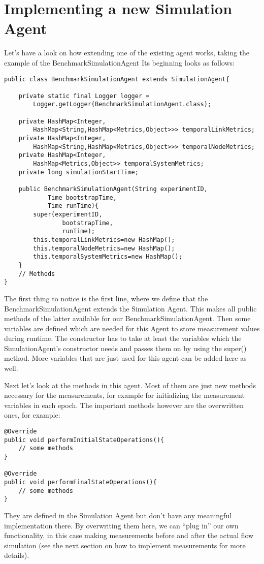 \documentclass[11pt,fleqn]{book} %
\newcommand{\MainAgent}{Simulation Agent}
\newcommand{\BenchmarkAgent}{BenchmarkSimulationAgent}
\begin{document}
\section{Implementing a new \MainAgent}
Let’s have a look on how extending one of the existing agent works, taking the example of the \BenchmarkAgent{} Its beginning looks as follows:
\begin{lstlisting}[frame=single]
public class BenchmarkSimulationAgent extends SimulationAgent{
    
    private static final Logger logger = 
    	Logger.getLogger(BenchmarkSimulationAgent.class);
    
    private HashMap<Integer,
    	HashMap<String,HashMap<Metrics,Object>>> temporalLinkMetrics;
    private HashMap<Integer,
    	HashMap<String,HashMap<Metrics,Object>>> temporalNodeMetrics;
    private HashMap<Integer,
    	HashMap<Metrics,Object>> temporalSystemMetrics;
    private long simulationStartTime;
    
    public BenchmarkSimulationAgent(String experimentID, 
            Time bootstrapTime, 
            Time runTime){
        super(experimentID,
                bootstrapTime,
                runTime);
        this.temporalLinkMetrics=new HashMap();
        this.temporalNodeMetrics=new HashMap();
        this.temporalSystemMetrics=new HashMap();
    }
    // Methods
}
\end{lstlisting}
The first thing to notice is the first line, where we define that the \BenchmarkAgent{} extends the \MainAgent{}. This makes all public methods of the latter available for our \BenchmarkAgent{}. Then some variables are defined which are needed for this Agent to store measurement values during runtime. The constructor has to take at least the variables which the SimulationAgent’s constructor needs and passes them on by using the super() method. More variables that are just used for this agent can be added here as well.

Next let’s look at the methods in this agent. Most of them are just new methods necessary for the measurements, for example for initializing the measurement variables in each epoch. The important methods however are the overwritten ones, for example:
\begin{lstlisting}[frame=single]
@Override
public void performInitialStateOperations(){
	// some methods
}
    
@Override
public void performFinalStateOperations(){
	// some methods
}
\end{lstlisting}
They are defined in the \MainAgent{} but don’t have any meaningful implementation there. By overwriting them here, we can “plug in” our own functionality, in this case making measurements before and after the actual flow simulation (see the next section on how to implement measurements for more details).
\end{document}
